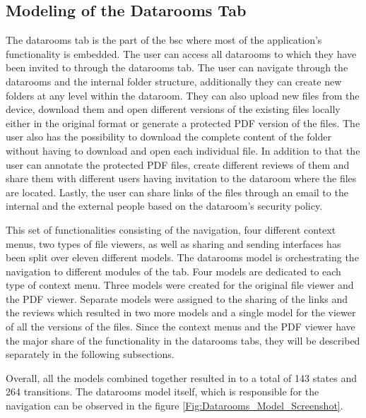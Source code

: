 \subsection{Modeling of the Datarooms Tab}
\par
The datarooms tab is the part of the \acrshort{bsc} where most of the application's functionality is embedded. The user can access all datarooms to which they have been invited to through the datarooms tab. The user can navigate through the datarooms and the internal folder structure, additionally they can create new folders at any level within the dataroom. They can also upload new files from the device, download them and open different versions of the existing files locally either in the original format or generate a protected PDF version of the files. The user also has the possibility to download the complete content of the folder without having to download and open each individual file. In addition to that the user can annotate the protected PDF files, create different reviews of them and share them with different users having invitation to the dataroom where the files are located. Lastly, the user can share links of the files through an email to the internal and the external people based on the dataroom's security policy.

\par
This set of functionalities consisting of the navigation, four different context menus, two types of file viewers, as well as sharing and sending interfaces has been split over eleven different models. The datarooms model is orchestrating the navigation to different modules of the tab. Four models are dedicated to each type of context menu. Three models were created for the original file viewer and the PDF viewer. Separate models were assigned to the sharing of the links and the reviews which resulted in two more models and a single model for the viewer of all the versions of the files. Since the context menus and the PDF viewer have the major share of the functionality in the datarooms tabs, they will be described separately in the following subsections.

\par
Overall, all the models combined together resulted in to a total of 143 states and 264 transitions. The datarooms model itself, which is responsible for the navigation can be observed in the figure \ref{Fig:Datarooms_Model_Screenshot}.

